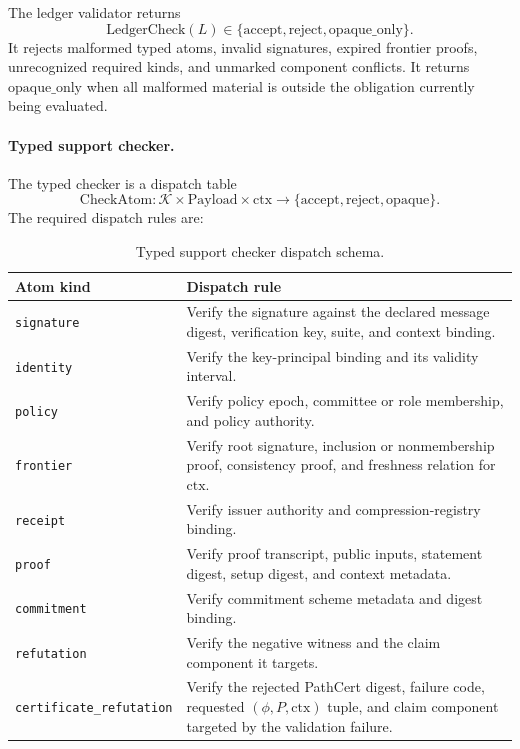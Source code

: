 \documentclass[11pt,twoside]{article}
\newcommand{\OGTableFont}{\small}
\newcommand{\OGTableHeaderRow}{\rowcolor{tableheaderbg}}
\newcommand{\TableHeaderRow}{\OGTableHeaderRow}
\newenvironment{OGTable}[2][ht]{%
  \begin{table}[#1]
  \centering
  #2
  \renewcommand{\arraystretch}{1.08}%
  \rowcolors{2}{tablerowbg}{white}%
}{%
  \rowcolors{2}{}{}%
  \end{table}%
}
\theoremstyle{definition}
\newcommand{\ctx}{\mathrm{ctx}}
\begin{document}
The ledger validator returns
\[
  \mathrm{LedgerCheck}(L) \in
  \{\mathrm{accept},\mathrm{reject},\mathrm{opaque\_only}\}.
\]
It rejects malformed typed atoms, invalid signatures, expired frontier proofs,
unrecognized required kinds, and unmarked component conflicts. It returns
$\mathrm{opaque\_only}$ when all malformed material is outside the obligation
currently being evaluated.

\paragraph{Typed support checker.}
The typed checker is a dispatch table
\[
  \mathrm{CheckAtom}:\mathcal K\times\mathrm{Payload}\times\ctx
  \to\{\mathrm{accept},\mathrm{reject},\mathrm{opaque}\}.
\]
The required dispatch rules are:

\begin{OGTable}{\OGTableFont}
\begin{tabularx}{\textwidth}{>{\raggedright\arraybackslash}p{}>{\raggedright\arraybackslash}X}
\toprule
\TableHeaderRow \textbf{Atom kind} & \textbf{Dispatch rule} \\
\midrule
\texttt{signature} & Verify the signature against the declared message digest, verification key, suite, and context binding. \\
\texttt{identity} & Verify the key-principal binding and its validity interval. \\
\texttt{policy} & Verify policy epoch, committee or role membership, and policy authority. \\
\texttt{frontier} & Verify root signature, inclusion or nonmembership proof, consistency proof, and freshness relation for $\ctx$. \\
\texttt{receipt} & Verify issuer authority and compression-registry binding. \\
\texttt{proof} & Verify proof transcript, public inputs, statement digest, setup digest, and context metadata. \\
\texttt{commitment} & Verify commitment scheme metadata and digest binding. \\
\texttt{refutation} & Verify the negative witness and the claim component it targets. \\
\texttt{certificate\_refutation} & Verify the rejected PathCert digest, failure code, requested $(\phi,P,\ctx)$ tuple, and claim component targeted by the validation failure. \\
\bottomrule
\end{tabularx}
\caption{Typed support checker dispatch schema.}
\label{tab:typed-support-dispatch-schema}
\end{OGTable}
\FloatBarrier
\end{document}
